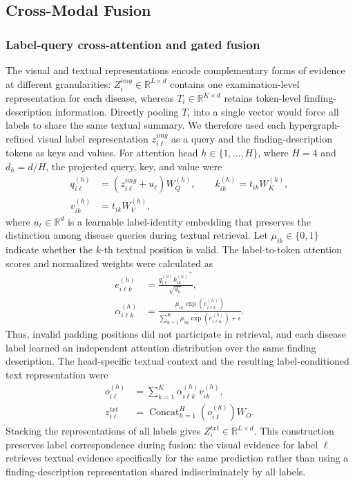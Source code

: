 \documentclass[Afour,sagev,times]{sagej}
\begin{document}
\subsection{Cross-Modal Fusion}

\subsubsection{Label-query cross-attention and gated fusion}

The visual and textual representations encode complementary forms of evidence at different granularities: $Z_i^{img}\in\mathbb{R}^{L\times d}$ contains one examination-level representation for each disease, whereas $T_i\in\mathbb{R}^{K\times d}$ retains token-level finding-description information. Directly pooling $T_i$ into a single vector would force all labels to share the same textual summary. We therefore used each hypergraph-refined visual label representation $z_{i\ell}^{img}$ as a query and the finding-description tokens as keys and values. For attention head $h\in\{1,\ldots,H\}$, where $H=4$ and $d_h=d/H$, the projected query, key, and value were
\begin{equation}
\begin{aligned}
q_{i\ell}^{(h)}&=(z_{i\ell}^{img}+u_{\ell})W_Q^{(h)},\qquad
k_{ik}^{(h)}=t_{ik}W_K^{(h)},\\
v_{ik}^{(h)}&=t_{ik}W_V^{(h)},
\end{aligned}
\end{equation}
where $u_{\ell}\in\mathbb{R}^{d}$ is a learnable label-identity embedding that preserves the distinction among disease queries during textual retrieval.
Let $\mu_{ik}\in\{0,1\}$ indicate whether the $k$-th textual position is valid. The label-to-token attention scores and normalized weights were calculated as
\begin{equation}
\begin{aligned}
e_{i\ell k}^{(h)}&=\frac{q_{i\ell}^{(h)}{k_{ik}^{(h)}}^{\top}}{\sqrt{d_h}},\\
\alpha_{i\ell k}^{(h)}&=
\frac{\mu_{ik}\exp(e_{i\ell k}^{(h)})}
{\sum_{u=1}^{K}\mu_{iu}\exp(e_{i\ell u}^{(h)})+\epsilon}.
\end{aligned}
\end{equation}
Thus, invalid padding positions did not participate in retrieval, and each disease label learned an independent attention distribution over the same finding description. The head-specific textual context and the resulting label-conditioned text representation were
\begin{equation}
\begin{aligned}
o_{i\ell}^{(h)}&=\sum_{k=1}^{K}\alpha_{i\ell k}^{(h)}v_{ik}^{(h)},\\
z_{i\ell}^{txt}&=\operatorname{Concat}_{h=1}^{H}\!\left(o_{i\ell}^{(h)}\right)W_O.
\end{aligned}
\end{equation}
Stacking the representations of all labels gives $Z_i^{txt}\in\mathbb{R}^{L\times d}$. This construction preserves label correspondence during fusion: the visual evidence for label $\ell$ retrieves textual evidence specifically for the same prediction rather than using a finding-description representation shared indiscriminately by all labels.
\end{document}
